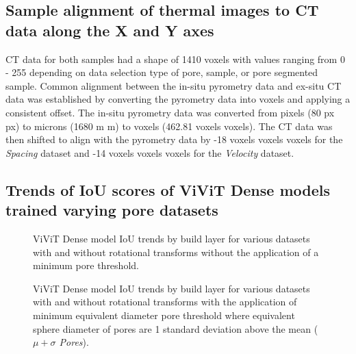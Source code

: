 \subsection{
  Sample alignment of thermal images to CT data along the X and Y
  axes
}
CT data for both samples had a shape of 1410 \texttimes{} \texttimes{}
voxels with values ranging from 0 - 255 depending on data selection type of
pore, sample, or pore segmented sample. Common alignment between the in-situ
pyrometry data and ex-situ CT data was established by converting the pyrometry
data into voxels and applying a consistent offset. The in-situ pyrometry data
was converted from pixels (80 px \texttimes{} px) to microns (1680 \textmu m
\texttimes{} \textmu m) to voxels (462.81 voxels \texttimes{} voxels).
The CT data was then shifted to align with the pyrometry data by -18 voxels
\texttimes{} voxels \texttimes{} voxels for the \textit{Spacing} dataset and
-14 voxels \texttimes{} voxels \texttimes{} voxels for the \textit{Velocity}
dataset.

\clearpage

\subsection{Trends of IoU scores of ViViT Dense models trained varying pore datasets}

\begin{figure}[hbtp]
    \centering
    
    \caption{
        ViViT Dense model IoU trends by build layer for various datasets with and
        without rotational transforms without the application of a minimum pore
        threshold.
    }
    \label{fig:pore_localization_results}
\end{figure}

\begin{figure}[hbtp]
    \centering
    
    \caption{
        ViViT Dense model IoU trends by build layer for various datasets with
        and without rotational transforms with the application of minimum
        equivalent diameter pore threshold where equivalent sphere diameter of
        pores are 1 standard deviation above the mean (\textit{$\mu + \sigma$
        Pores}).
    }
    \label{fig:pore_localization_results_thresholded}
\end{figure}
